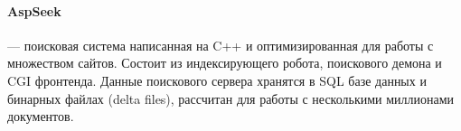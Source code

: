 \paragraph{AspSeek} --- поисковая система написанная на C++ и оптимизированная для работы с
множеством сайтов. Состоит из индексирующего робота, поискового демона и CGI
фронтенда. Данные поискового сервера хранятся в SQL базе данных и бинарных
файлах (delta files), рассчитан для работы с несколькими миллионами документов.


